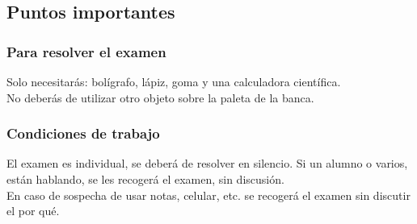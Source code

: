 \documentclass[14pt]{beamer}
\begin{document}
\subsection{Puntos importantes}

\begin{frame}
\frametitle{Para resolver el examen}
Solo necesitarás: bolígrafo, lápiz, goma y una calculadora científica.
\\
\bigskip
\pause
No deberás de utilizar otro objeto sobre la paleta de la banca.
\end{frame}
\begin{frame}
\frametitle{Condiciones de trabajo}
El examen es individual, \pause se deberá de resolver en silencio. \pause Si un alumno o varios, están hablando, se les recogerá el examen, sin discusión.
\\
\bigskip
\pause
En caso de sospecha de usar notas, celular, etc. se recogerá el examen sin discutir el por qué.
\end{frame}
\end{document}
